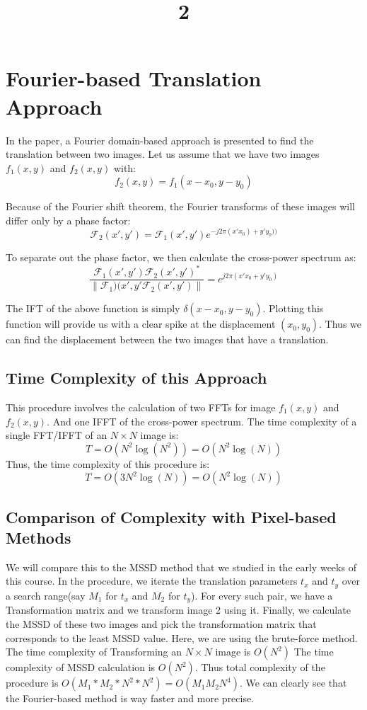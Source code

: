 \documentclass[a4paper]{article}
\title{2}
\date{}
\begin{document}
\maketitle
\section{Fourier-based Translation Approach}
In the paper, a Fourier domain-based approach is presented to find the translation between two images. Let us assume that we have two images $f_1(x,y)$ and $f_2(x,y)$
with:
\[f_2(x,y) = f_1(x-x_0,y-y_0)\]

Because of the Fourier shift theorem, the Fourier transforms of these images will differ only by a phase factor:
\[\mathscr{F}_2(x',y') = \mathscr{F}_1(x',y') e^{-j2\pi(x'x_0) + y'y_0))}\]

To separate out the phase factor, we then calculate the cross-power spectrum as:
\[\frac{\mathscr{F_1}(x',y') \mathscr{F_2}(x',y')^*}{\|\mathscr{F_1)}(x',y'\mathscr{F_2}(x',y') \|} = e^{j2 \pi (x'x_0 + y'y_0 )}\]

The IFT of the above function is simply $\delta(x-x_0, y-y_0)$. Plotting this function will provide us with a clear spike at the displacement $(x_0, y_0)$.
Thus we can find the displacement between the two images that have a translation.

\subsection{Time Complexity of this Approach}
This procedure involves the calculation of two FFTs for image $f_1(x,y)$ and $f_2(x,y)$. And one IFFT of the cross-power spectrum.
The time complexity of a single FFT/IFFT of an $N \times N$ image is:
\[T = O(N^2 \operatorname{log}(N^2)) = O(N^2 \operatorname{log}(N)) \]
Thus, the time complexity of this procedure is:
\[T = O(3N^2 \operatorname{log}(N)) = O(N^2 \operatorname{log}(N)) \]

\subsection{Comparison of Complexity with Pixel-based Methods}
We will compare this to the MSSD method that we studied in the early weeks of this course. In the procedure, we iterate the translation parameters $t_x$ and $t_y$ over a search range(say $M_1$ for $t_x$ and $M_2$ for $t_y$). For every such pair, we have a Transformation matrix and we transform image 2 using it. Finally, we calculate the MSSD of these two images and pick the transformation matrix that corresponds to the least MSSD value. Here, we are using the brute-force method.
The time complexity of Transforming an $N\times N$ image is $O(N^2)$
The time complexity of MSSD calculation is $O(N^2)$. Thus total complexity of the procedure is $O(M_1*M_2*N^2*N^2) = O(M_1M_2N^4)$.
We can clearly see that the Fourier-based method is way faster and more precise.
\end{document}
